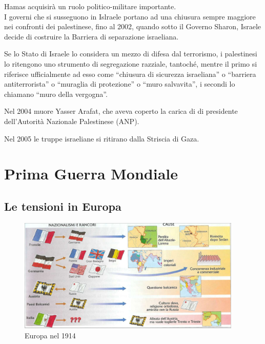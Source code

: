 \documentclass[a4paper]{article}
\newcommand{\quotes}[1]{``#1''}
\begin{document}
Hamas acquisirà un ruolo politico-militare importante.
\\
I governi che si susseguono in Islraele portano ad una chiusura sempre maggiore
nei confronti dei palestinese, fino al 2002, quando sotto il Governo
Sharon, Israele decide di costruire la Barriera di separazione israeliana.


Se lo Stato di Israele lo considera un mezzo di difesa dal terrorismo,
i palestinesi lo ritengono uno strumento di segregazione razziale,
tantoché, mentre il primo si riferisce ufficialmente ad esso come
\quotes{chiusura di sicurezza israeliana} o \quotes{barriera antiterrorista} o
\quotes{muraglia di protezione} o \quotes{muro salvavita},
i secondi lo chiamano \quotes{muro della vergogna}.

Nel 2004 muore Yasser Arafat, che aveva coperto la carica di
di presidente dell'Autorità Nazionale Palestinese (ANP).

Nel 2005 le truppe israeliane si ritirano dalla Striscia di Gaza.

\pagebreak

\section{Prima Guerra Mondiale}


\subsection{Le tensioni in Europa}

\begin{center}
\begin{figure}[th]
    \centering
    \includegraphics[width=0.95\textwidth]{./europa_1914.png}
    \caption{Europa nel 1914}
\end{figure}
\end{center}
\end{document}
